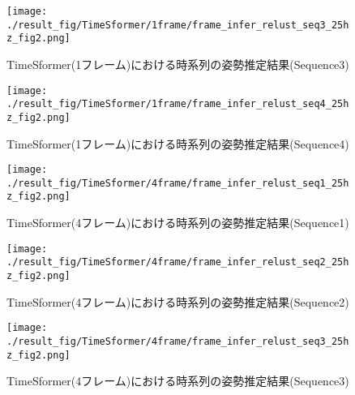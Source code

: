 \begin{figure}[thpb]
  \begin{minipage}[htpb]{1.0\hsize}
  \begin{center}
  \texttt{[image: ./result\_fig/TimeSformer/1frame/frame\_infer\_relust\_seq3\_25hz\_fig2.png]}
  \caption{TimeSformer(1フレーム)における時系列の姿勢推定結果(Sequence3)}
  \end{center}
  \end{minipage}
\end{figure}

\begin{figure}[thpb]
  \begin{minipage}[htpb]{1.0\hsize}
  \begin{center}
  \texttt{[image: ./result\_fig/TimeSformer/1frame/frame\_infer\_relust\_seq4\_25hz\_fig2.png]}
  \caption{TimeSformer(1フレーム)における時系列の姿勢推定結果(Sequence4)}
  \end{center}
  \end{minipage}
\end{figure}


\begin{figure}[thpb]
  \begin{minipage}[htpb]{1.0\hsize}
  \begin{center}
  \texttt{[image: ./result\_fig/TimeSformer/4frame/frame\_infer\_relust\_seq1\_25hz\_fig2.png]}
  \caption{TimeSformer(4フレーム)における時系列の姿勢推定結果(Sequence1)}
  \end{center}
  \end{minipage}
\end{figure}

\begin{figure}[thpb]
  \begin{minipage}[htpb]{1.0\hsize}
  \begin{center}
  \texttt{[image: ./result\_fig/TimeSformer/4frame/frame\_infer\_relust\_seq2\_25hz\_fig2.png]}
  \caption{TimeSformer(4フレーム)における時系列の姿勢推定結果(Sequence2)}
  \end{center}
  \end{minipage}
\end{figure}


\begin{figure}[thpb]
  \begin{minipage}[htpb]{1.0\hsize}
  \begin{center}
  \texttt{[image: ./result\_fig/TimeSformer/4frame/frame\_infer\_relust\_seq3\_25hz\_fig2.png]}
  \caption{TimeSformer(4フレーム)における時系列の姿勢推定結果(Sequence3)}
  \end{center}
  \end{minipage}
\end{figure}


